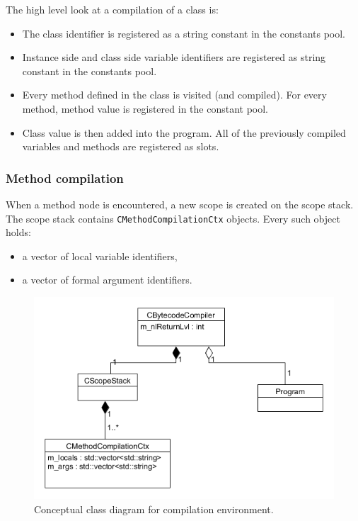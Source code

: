 \documentclass[thesis=M,english]{FITthesis}[2019/12/23]
\begin{document}
The high level look at a compilation of a class is:
\begin{itemize}
	\item The class identifier is registered as a string constant in the constants pool.
	\item Instance side and class side variable identifiers are registered as string constant in the constants pool.
	\item Every method defined in the class is visited (and compiled). For every method, method value is registered in the constant pool.
	\item Class value is then added into the program. All of the previously compiled variables and methods are registered as slots.
\end{itemize}

\subsubsection{Method compilation}
When a method node is encountered, a new scope is created on the scope stack. The scope stack contains \texttt{CMethodCompilationCtx} objects. Every such object holds:
\begin{itemize}
	\item a vector of local variable identifiers,
	\item a vector of formal argument identifiers.
\end{itemize}

\begin{figure}[h!]
	\centering
	\includegraphics[width=\textwidth]{media/classDiagram_compilation.png}
	\caption{Conceptual class diagram for compilation environment.}
	\label{fig:class_compilation}
\end{figure}
\end{document}
